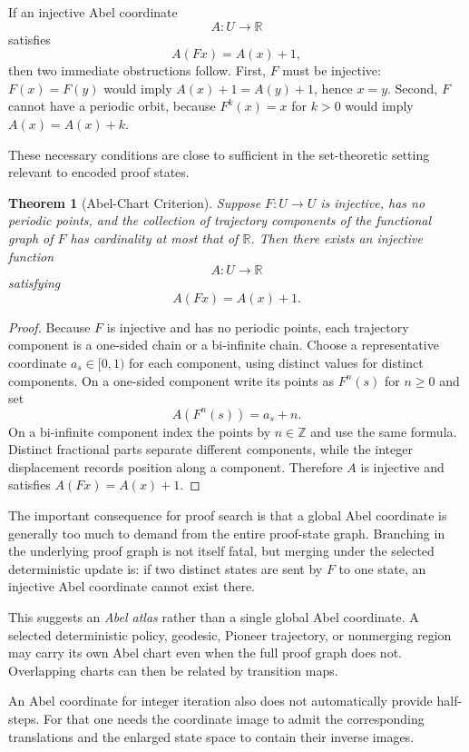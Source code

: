 \documentclass[11pt]{article}
\newtheorem{theorem}{Theorem}[section]
\begin{document}
If an injective Abel coordinate
\[
A:U\to\mathbb R
\]
satisfies
\[
A(Fx)=A(x)+1,
\]
then two immediate obstructions follow. First, $F$ must be injective: $F(x)=F(y)$ would imply $A(x)+1=A(y)+1$, hence $x=y$. Second, $F$ cannot have a periodic orbit, because $F^k(x)=x$ for $k>0$ would imply $A(x)=A(x)+k$.

These necessary conditions are close to sufficient in the set-theoretic setting relevant to encoded proof states.

\begin{theorem}[Abel-Chart Criterion]
Suppose $F:U\to U$ is injective, has no periodic points, and the collection of trajectory components of the functional graph of $F$ has cardinality at most that of $\mathbb R$. Then there exists an injective function
\[
A:U\to\mathbb R
\]
satisfying
\[
A(Fx)=A(x)+1.
\]
\end{theorem}

\begin{proof}
Because $F$ is injective and has no periodic points, each trajectory component is a one-sided chain or a bi-infinite chain. Choose a representative coordinate $a_s\in[0,1)$ for each component, using distinct values for distinct components. On a one-sided component write its points as $F^n(s)$ for $n\ge0$ and set
\[
A(F^n(s))=a_s+n.
\]
On a bi-infinite component index the points by $n\in\mathbb Z$ and use the same formula. Distinct fractional parts separate different components, while the integer displacement records position along a component. Therefore $A$ is injective and satisfies $A(Fx)=A(x)+1$.
\end{proof}

The important consequence for proof search is that a global Abel coordinate is generally too much to demand from the entire proof-state graph. Branching in the underlying proof graph is not itself fatal, but merging under the selected deterministic update is: if two distinct states are sent by $F$ to one state, an injective Abel coordinate cannot exist there.

This suggests an \emph{Abel atlas} rather than a single global Abel coordinate. A selected deterministic policy, geodesic, Pioneer trajectory, or nonmerging region may carry its own Abel chart even when the full proof graph does not. Overlapping charts can then be related by transition maps.

An Abel coordinate for integer iteration also does not automatically provide half-steps. For that one needs the coordinate image to admit the corresponding translations and the enlarged state space to contain their inverse images.
\end{document}
